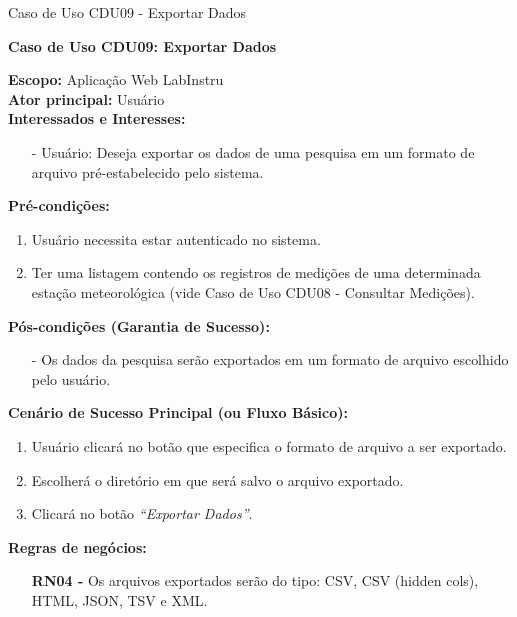 \begin{quadro}[H]
	\centering
	\caption{Caso de Uso CDU09 - Exportar Dados}

	\begin{framed}

		\textbf{Caso de Uso CDU09: Exportar Dados}\\

		\begin{flushleft}

		\textbf{Escopo:} Aplicação Web LabInstru\\

		\textbf{Ator principal:} Usuário\\

		\textbf{Interessados e Interesses:}
		\begin{itemize}
			\item[-] Usuário: Deseja exportar os dados de uma pesquisa em um formato de arquivo pré-estabelecido pelo sistema.
		\end{itemize}

		\textbf{Pré-condições:}\\
			 \begin{enumerate}
			 	\item{Usuário necessita estar autenticado no sistema.}
			 	\item{Ter uma listagem contendo os registros de medições de uma determinada estação meteorológica (vide Caso de Uso CDU08 - Consultar Medições).}
			 \end{enumerate}

		\textbf{Pós-condições (Garantia de Sucesso):}
		\begin{itemize}
		\item[-] Os dados da pesquisa serão exportados em um formato de arquivo escolhido pelo usuário.
		\end{itemize}

		\textbf{Cenário de Sucesso Principal (ou Fluxo Básico):}\\
			\begin{enumerate}
			 	\item{Usuário clicará no botão que especifica o formato de arquivo a ser exportado.}
			 	\item{Escolherá o diretório em que será salvo o arquivo exportado.}
			 	\item{Clicará no botão \textit{``Exportar Dados''}.}
			 \end{enumerate}

		\textbf{Regras de negócios:}
		\begin{itemize}
			\item[] \textbf{RN04 - } Os arquivos exportados serão do tipo: CSV, CSV (hidden cols), HTML, JSON, TSV e XML.
		\end{itemize}
		\end{flushleft}

	\end{framed}

\end {quadro} %

